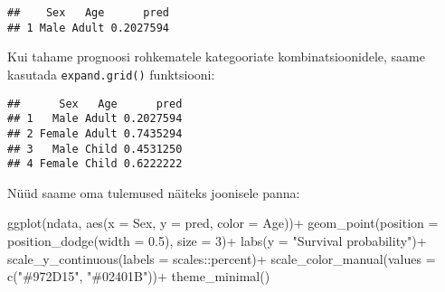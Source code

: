 \documentclass[
]{book}
\newenvironment{Shaded}{\begin{snugshade}}{\end{snugshade}}
\newcommand{\AttributeTok}[1]{\textcolor[rgb]{0.77,0.63,0.00}{#1}}
\newcommand{\CommentTok}[1]{\textcolor[rgb]{0.56,0.35,0.01}{\textit{#1}}}
\newcommand{\DecValTok}[1]{\textcolor[rgb]{0.00,0.00,0.81}{#1}}
\newcommand{\FloatTok}[1]{\textcolor[rgb]{0.00,0.00,0.81}{#1}}
\newcommand{\FunctionTok}[1]{\textcolor[rgb]{0.00,0.00,0.00}{#1}}
\newcommand{\NormalTok}[1]{#1}
\newcommand{\OtherTok}[1]{\textcolor[rgb]{0.56,0.35,0.01}{#1}}
\newcommand{\SpecialCharTok}[1]{\textcolor[rgb]{0.00,0.00,0.00}{#1}}
\newcommand{\StringTok}[1]{\textcolor[rgb]{0.31,0.60,0.02}{#1}}
\begin{document}
\begin{verbatim}
##    Sex   Age      pred
## 1 Male Adult 0.2027594
\end{verbatim}

Kui tahame prognoosi rohkematele kategooriate kombinatsioonidele, saame kasutada \texttt{expand.grid()} funktsiooni:

\begin{Shaded}
\end{Shaded}

\begin{verbatim}
##      Sex   Age      pred
## 1   Male Adult 0.2027594
## 2 Female Adult 0.7435294
## 3   Male Child 0.4531250
## 4 Female Child 0.6222222
\end{verbatim}

Nüüd saame oma tulemused näiteks joonisele panna:

\begin{Shaded}
\begin{Highlighting}[]
\FunctionTok{ggplot}\NormalTok{(ndata, }\FunctionTok{aes}\NormalTok{(}\AttributeTok{x =}\NormalTok{ Sex, }\AttributeTok{y =}\NormalTok{ pred, }\AttributeTok{color =}\NormalTok{ Age))}\SpecialCharTok{+}
  \FunctionTok{geom\_point}\NormalTok{(}\AttributeTok{position =} \FunctionTok{position\_dodge}\NormalTok{(}\AttributeTok{width =} \FloatTok{0.5}\NormalTok{), }\AttributeTok{size =} \DecValTok{3}\NormalTok{)}\SpecialCharTok{+}
  \FunctionTok{labs}\NormalTok{(}\AttributeTok{y =} \StringTok{"Survival probability"}\NormalTok{)}\SpecialCharTok{+}
  \FunctionTok{scale\_y\_continuous}\NormalTok{(}\AttributeTok{labels =}\NormalTok{ scales}\SpecialCharTok{::}\NormalTok{percent)}\SpecialCharTok{+}
  \FunctionTok{scale\_color\_manual}\NormalTok{(}\AttributeTok{values =} \FunctionTok{c}\NormalTok{(}\StringTok{"\#972D15"}\NormalTok{, }\StringTok{"\#02401B"}\NormalTok{))}\SpecialCharTok{+}
  \FunctionTok{theme\_minimal}\NormalTok{()}
\end{Highlighting}
\end{Shaded}
\end{document}
